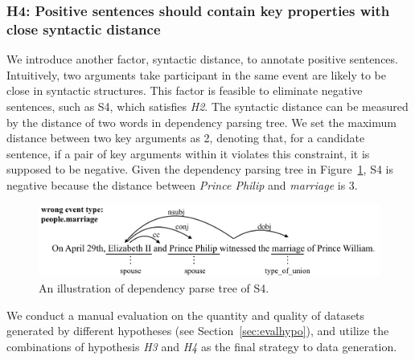 \subsubsection{H4: Positive sentences should contain key properties with close syntactic distance}
We introduce another factor, syntactic distance, to annotate positive sentences. Intuitively, two arguments take participant in the same event are likely to be close in syntactic structures. This factor is feasible to eliminate negative sentences, such as S4, which satisfies \emph{H2}. The syntactic distance can be measured by the distance of two words in dependency parsing tree. We set the maximum distance between two key arguments as 2, denoting that, for a candidate sentence, if a pair of key arguments within it violates this constraint, it is supposed to be negative. Given the dependency parsing tree in  Figure~\ref{fig:2}, S4 is negative because the distance between \emph{Prince Philip} and \emph{marriage} is 3.

\begin{figure}
	\includegraphics[width=.48\textwidth]{deppath}
	\caption{An illustration of dependency parse tree of S4. \label{fig:2}}
\end{figure}

We conduct a manual evaluation on the quantity and quality of  datasets generated by different hypotheses (see Section~\ref{sec:evalhypo}), and utilize the combinations of hypothesis \emph{H3} and \emph{H4} as the final strategy to data generation.
